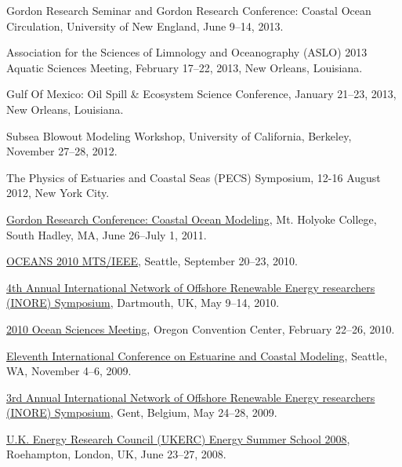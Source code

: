 \documentclass[10pt,letterpaper]{article}
\renewenvironment{itemize}{
  \begin{list}{}{
    \setlength{\leftmargin}{1.5em}
    \setlength{\itemsep}{0.25em}
    \setlength{\parskip}{0pt}
    \setlength{\parsep}{0.25em}
  }
}{
  \end{list}
}
\begin{document}
\begin{itemize}

\item Gordon Research Seminar and Gordon Research Conference: Coastal Ocean Circulation, University of New England, June 9--14, 2013.

\item Association for the Sciences of Limnology and Oceanography (ASLO) 2013 Aquatic Sciences Meeting, February 17--22, 2013, New Orleans, Louisiana.

\item Gulf Of Mexico: Oil Spill \& Ecosystem Science Conference, January 21--23, 2013, New Orleans, Louisiana.

\item Subsea Blowout Modeling Workshop, University of California, Berkeley, November 27--28, 2012.

\item The Physics of Estuaries and Coastal Seas (PECS) Symposium, 12-16 August 2012, New York City.

\item \href{http://www.grc.org/programs.aspx?year=2011&program=coastal}{Gordon Research Conference: Coastal Ocean Modeling},
  Mt. Holyoke College, South Hadley,  MA, 
  June 26--July 1, 2011.

\item \href{http://www.oceans10mtsieeeseattle.org/}{OCEANS 2010 MTS/IEEE},
  Seattle,
  September 20--23, 2010.

\item \href{http://www.inore.org}{4th Annual International Network of Offshore Renewable Energy researchers (INORE) Symposium},
  Dartmouth, UK,
  May 9--14, 2010.

\item \href{http://www.agu.org/meetings/os10/}{2010 Ocean Sciences Meeting},
  Oregon Convention Center,
  February 22--26, 2010.

\item \href{http://www.oce.uri.edu/ecm11/index.html}{Eleventh International Conference on Estuarine and Coastal Modeling},
  Seattle, WA,
  November 4--6, 2009.

\item \href{http://www.inore.org}{3rd Annual International Network of Offshore Renewable Energy researchers (INORE) Symposium},
  Gent, Belgium,
  May 24--28, 2009.

\item \href{http://www.ukerc.ac.uk/support/tiki-index.php?page=0608UKERCSummerSchool}{U.K. Energy Research Council (UKERC) Energy Summer School 2008},
  Roehampton, London, UK,
  June 23--27, 2008.

\end{itemize}
\end{document}
